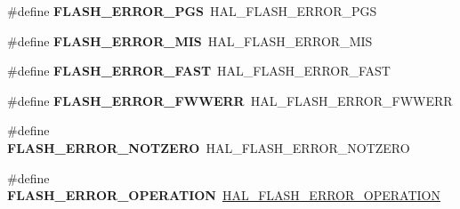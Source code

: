 \begin{DoxyCompactItemize}
\item 
\hypertarget{group___h_a_l___f_l_a_s_h___aliased___defines_ga578b6dd558f1d11d9791b3c63a61e14b}{\#define {\bfseries F\-L\-A\-S\-H\-\_\-\-E\-R\-R\-O\-R\-\_\-\-P\-G\-S}~H\-A\-L\-\_\-\-F\-L\-A\-S\-H\-\_\-\-E\-R\-R\-O\-R\-\_\-\-P\-G\-S}\label{group___h_a_l___f_l_a_s_h___aliased___defines_ga578b6dd558f1d11d9791b3c63a61e14b}

\item 
\hypertarget{group___h_a_l___f_l_a_s_h___aliased___defines_ga10229d78c25e0d944031910606462be1}{\#define {\bfseries F\-L\-A\-S\-H\-\_\-\-E\-R\-R\-O\-R\-\_\-\-M\-I\-S}~H\-A\-L\-\_\-\-F\-L\-A\-S\-H\-\_\-\-E\-R\-R\-O\-R\-\_\-\-M\-I\-S}\label{group___h_a_l___f_l_a_s_h___aliased___defines_ga10229d78c25e0d944031910606462be1}

\item 
\hypertarget{group___h_a_l___f_l_a_s_h___aliased___defines_gad20c28b002e14116facba21f02b0d1ba}{\#define {\bfseries F\-L\-A\-S\-H\-\_\-\-E\-R\-R\-O\-R\-\_\-\-F\-A\-S\-T}~H\-A\-L\-\_\-\-F\-L\-A\-S\-H\-\_\-\-E\-R\-R\-O\-R\-\_\-\-F\-A\-S\-T}\label{group___h_a_l___f_l_a_s_h___aliased___defines_gad20c28b002e14116facba21f02b0d1ba}

\item 
\hypertarget{group___h_a_l___f_l_a_s_h___aliased___defines_ga9386eae0fe9e5b47720ad2378d27e743}{\#define {\bfseries F\-L\-A\-S\-H\-\_\-\-E\-R\-R\-O\-R\-\_\-\-F\-W\-W\-E\-R\-R}~H\-A\-L\-\_\-\-F\-L\-A\-S\-H\-\_\-\-E\-R\-R\-O\-R\-\_\-\-F\-W\-W\-E\-R\-R}\label{group___h_a_l___f_l_a_s_h___aliased___defines_ga9386eae0fe9e5b47720ad2378d27e743}

\item 
\hypertarget{group___h_a_l___f_l_a_s_h___aliased___defines_ga987edd2bf3a39310a655473718d9b495}{\#define {\bfseries F\-L\-A\-S\-H\-\_\-\-E\-R\-R\-O\-R\-\_\-\-N\-O\-T\-Z\-E\-R\-O}~H\-A\-L\-\_\-\-F\-L\-A\-S\-H\-\_\-\-E\-R\-R\-O\-R\-\_\-\-N\-O\-T\-Z\-E\-R\-O}\label{group___h_a_l___f_l_a_s_h___aliased___defines_ga987edd2bf3a39310a655473718d9b495}

\item 
\hypertarget{group___h_a_l___f_l_a_s_h___aliased___defines_gaae29e90680573edfa4e11e07b2557f16}{\#define {\bfseries F\-L\-A\-S\-H\-\_\-\-E\-R\-R\-O\-R\-\_\-\-O\-P\-E\-R\-A\-T\-I\-O\-N}~\hyperlink{group___f_l_a_s_h___error___codes_gafa1433e0ca2366478928c04244310d44}{H\-A\-L\-\_\-\-F\-L\-A\-S\-H\-\_\-\-E\-R\-R\-O\-R\-\_\-\-O\-P\-E\-R\-A\-T\-I\-O\-N}}\label{group___h_a_l___f_l_a_s_h___aliased___defines_gaae29e90680573edfa4e11e07b2557f16}


\end{DoxyCompactItemize}
